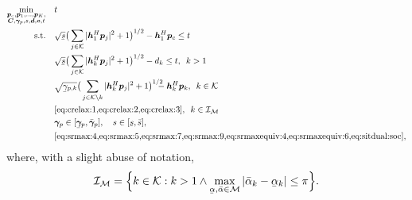 \documentclass[a4paper,10pt,journal]{IEEEtran}
\let\vec\bm
\newcommand{\ubar}[1]{\underaccent{\bar}{#1}}
\begin{document}
\begin{subequations} \label{eq:sitbndfirst}
	\begin{align}
		\min_{\substack{\vec p_c, \vec p_1, \dots, \vec p_K,\\ \vec C, \vec \gamma_p, s, \vec d, \vec e, t}}\quad & t \\
	\mbox{s.t.}\quad
%
	& \sqrt{\ubar{s}} \big( \sum\limits_{j\in\mathcal{K}}|\vec{h}_{1}^{H}\vec{p}_{j}|^2+1 \big)^{1/2} - {\vec{h}}_{1}^{H}\vec{p}_{c} \le t \label{eq:sitbndfirst:1}\\
	& \sqrt{\ubar{s}} \big( \sum\limits_{j\in\mathcal{K}}|\vec{h}_{k}^{H}\vec{p}_{j}|^2+1 \big)^{1/2} - d_k \le t,\enskip k > 1 \label{eq:sitbndfirst:2}\\
	& \sqrt{\ubar{\gamma}_{p,k}} \big( \sum\limits_{j\in\mathcal{K}\setminus k}|\vec{h}_{k}^{H}\vec{p}_{j}|^2+1 \big)^{1/2}\!\!\!\!\! - {\vec{h}}_{k}^{H}\vec{p}_{k},\enskip k\in\mathcal K \label{eq:sitbndfirst:3}\\
	& \text{\cref{eq:crelax:1,eq:crelax:2,eq:crelax:3}},\enskip k\in\mathcal I_{\mathcal M} \label{eq:sitbndfirst:5}\\
	& \vec\gamma_p \in [\ubar{\vec\gamma}_p, \bar{\vec\gamma}_p],\quad s\in [\ubar s, \bar s], \label{eq:sitbndfirst:4} \\
	& \text{\cref{eq:srmax:4,eq:srmax:5,eq:srmax:7,eq:srmax:9,eq:srmaxequiv:4,eq:srmaxequiv:6,eq:sitdual:soc}},
	\end{align}
\end{subequations}
where, with a slight abuse of notation,
\begin{equation}
	\mathcal I_{\mathcal M} = \Big\{ k\in\mathcal K : k > 1 \land \max_{\ubar{\alpha}, \bar{\alpha} \in \mathcal M} | \bar{\alpha}_k - \ubar{\alpha}_k | \le \pi \Big\}.
\end{equation}
\end{document}
